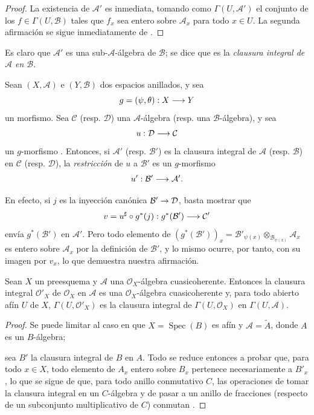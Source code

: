 \documentclass[oneside,10pt]{amsart}
\makeatletter
\newcommand{\ega@arrow}[2]{\mathchoice{#1}{#2}{#2}{#2}}
\renewcommand{\to}{\ega@arrow{\longrightarrow}{\rightarrow}}
\newcommand{\oldpage}[2][]{\marginnote{\normalfont\footnotesize\textbf{#1}~|~#2}\ignorespaces}
\let\EGAOriginalLabel\label
\renewcommand{\label}[1]{\phantomsection\EGAOriginalLabel{#1}}
\makeatother
\begin{document}
\begin{proof}
La existencia de $\mathcal{A}'$ es inmediata, tomando como $\Gamma(U,\mathcal{A}')$ el conjunto de los $f\in\Gamma(U,\mathcal{B})$ tales que $f_x$ sea entero sobre $\mathcal{A}_x$ para todo $x\in U$.
La segunda afirmación se sigue inmediatamente de .
\end{proof}

Es claro que $\mathcal{A}'$ es una sub-$\mathcal{A}$-álgebra de $\mathcal{B}$;
se dice que es la \emph{clausura integral de $\mathcal{A}$ en $\mathcal{B}$}.

\begin{env}[6.3.3]
\label{II.6.3.3-fr}
Sean $(X,\mathcal{A})$ e $(Y,\mathcal{B})$ dos espacios anillados, y sea
\[
g=(\psi,\theta):X\to Y
\]
un morfismo.
Sea $\mathcal{C}$ (resp. $\mathcal{D}$) una $\mathcal{A}$-álgebra (resp. una $\mathcal{B}$-álgebra), y sea
\[
u:\mathcal{D}\to\mathcal{C}
\]
un $g$-morfismo .
Entonces, si $\mathcal{A}'$ (resp. $\mathcal{B}'$) es la clausura integral de $\mathcal{A}$ (resp. $\mathcal{B}$) en $\mathcal{C}$ (resp. $\mathcal{D}$), la \emph{restricción} de $u$ a $\mathcal{B}'$ es un $g$-morfismo
\[
u':\mathcal{B}'\to\mathcal{A}'.
\]

En efecto, si $j$ es la inyección canónica $\mathcal{B}'\to\mathcal{D}$, basta mostrar que
\[
v=u^\sharp\circ g^*(j):g^*(\mathcal{B}')\to\mathcal{C}'
\]
envía $g^*(\mathcal{B}')$ en $\mathcal{A}'$.
Pero todo elemento de $(g^*(\mathcal{B}'))_x=\mathcal{B}'_{\psi(x)}\otimes_{\mathcal{B}_{\psi(x)}}
\mathcal{A}_x$ es entero sobre $\mathcal{A}_x$ por la definición de $\mathcal{B}'$, y lo mismo ocurre, por tanto, con su imagen por $v_x$, lo que demuestra nuestra afirmación.
\end{env}

\begin{proposition}[6.3.4]
\label{II.6.3.4-fr}
Sean $X$ un preesquema y $\mathcal{A}$ una $\mathcal{O}_X$-álgebra cuasicoherente.
Entonces la clausura integral $\mathcal{O}'_X$ de $\mathcal{O}_X$ en $\mathcal{A}$ es una $\mathcal{O}_X$-álgebra cuasicoherente y, para todo abierto afín $U$ de $X$, $\Gamma(U,\mathcal{O}'_X)$ es la clausura integral de $\Gamma(U,\mathcal{O}_X)$ en $\Gamma(U,\mathcal{A})$.
\end{proposition}

\begin{proof}
Se puede limitar al caso en que $X=\operatorname{Spec}(B)$ es afín y $\mathcal{A}=\widetilde{A}$, donde $A$ es un
\oldpage[II]{118}
 $B$-álgebra;

sea $B'$ la clausura integral de $B$ en $A$.
Todo se reduce entonces a probar que, para todo $x\in X$, todo elemento de $A_x$ entero sobre $B_x$ pertenece necesariamente a $B'_x$, lo que se sigue de que, para todo anillo conmutativo $C$, las operaciones de tomar la clausura integral en un $C$-álgebra y de pasar a un anillo de fracciones (respecto de un subconjunto multiplicativo de $C$) conmutan \cite[t.~I, pp.~261 y 257]{I-13}.
\end{proof}
\end{document}
